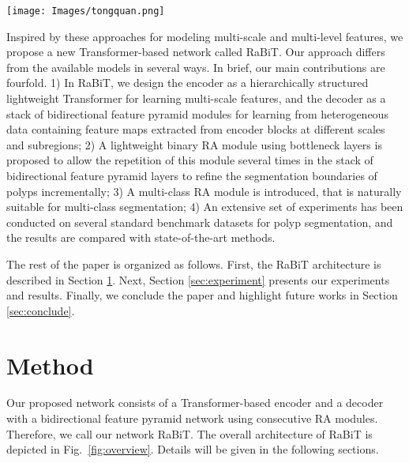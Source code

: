 \documentclass{article}
\begin{document}
\begin{figure*}[!ht]
\centering
\texttt{[image: Images/tongquan.png]} 
\caption{The overall architecture of our RaBiT contains two components: a lightweight MiT based encoder and a RaBiFPN decoder.} \label{fig:overview}
\end{figure*}

Inspired by these approaches for modeling multi-scale and multi-level features, we propose a new Transformer-based network called RaBiT. Our approach differs from the available models in several ways. In brief, our main contributions are
fourfold. 1) In RaBiT, we design the encoder as a hierarchically structured lightweight Transformer for learning multi-scale features, and the decoder as a stack of bidirectional feature pyramid modules for learning from heterogeneous data containing feature maps extracted from encoder blocks at different scales and subregions; 2) A lightweight binary RA module using bottleneck layers is proposed to allow the repetition of this module several times in the stack of bidirectional feature pyramid layers to refine the segmentation boundaries of polyps incrementally; 3) A multi-class RA module is introduced, that is naturally suitable for multi-class segmentation; 4) An extensive set of experiments has been conducted on several standard benchmark datasets for polyp segmentation, and the results are compared with state-of-the-art methods.

The rest of the paper is organized as follows. First, the RaBiT architecture is described in Section \ref{sec:propose}. Next, Section \ref{sec:experiment} presents our experiments and results. Finally, we conclude the paper and highlight future works in Section \ref{sec:conclude}.

\section{Method}
\label{sec:propose}
Our proposed network consists of a Transformer-based encoder and a decoder with a bidirectional feature pyramid network using consecutive RA modules. Therefore, we call our network RaBiT. The overall architecture of RaBiT is depicted in Fig.~\ref{fig:overview}. Details will be given in the following sections.
\end{document}
